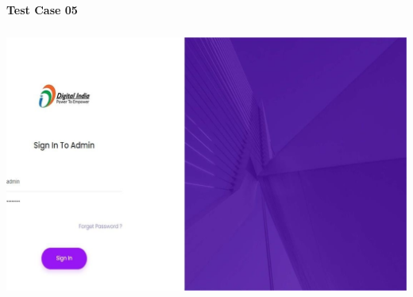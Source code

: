 \textbf{Test Case 05}
\begin{center}
\includegraphics[height=9cm,width=14cm]{Admin/TC05}
\end{center}

